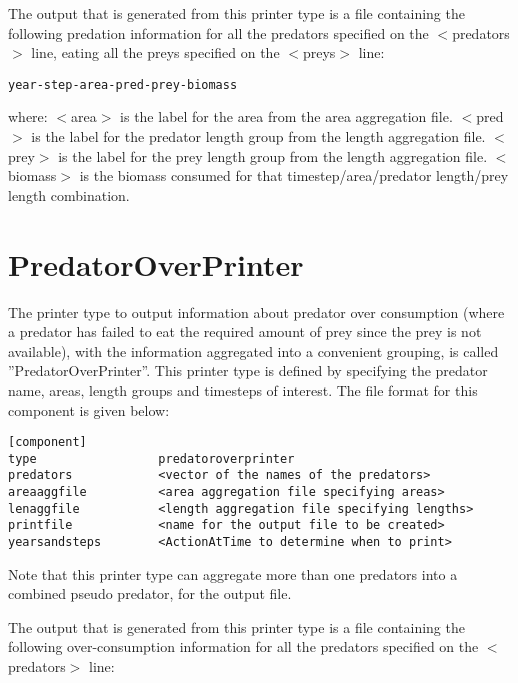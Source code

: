 \documentclass [a4paper, 10pt]{book}
\begin{document}
\bigskip
The output that is generated from this printer type is a file containing the following predation information for all the predators specified on the $<$predators$>$ line, eating all the preys specified on the $<$preys$>$ line:

{\small\begin{verbatim}
year-step-area-pred-prey-biomass
\end{verbatim}}

where:\newline
$<$area$>$ is the label for the area from the area aggregation file.\newline
$<$pred$>$ is the label for the predator length group from the length aggregation file.\newline
$<$prey$>$ is the label for the prey length group from the length aggregation file.\newline
$<$biomass$>$ is the biomass consumed for that timestep/area/predator length/prey length combination.

\section{PredatorOverPrinter}\label{sec:predatoroverprinter}
The printer type to output information about predator over consumption (where a predator has failed to eat the required amount of prey since the prey is not available), with the information aggregated into a convenient grouping, is called ''PredatorOverPrinter''.  This printer type is defined by specifying the predator name, areas, length groups and timesteps of interest.  The file format for this component is given below:

{\small\begin{verbatim}
[component]
type                 predatoroverprinter
predators            <vector of the names of the predators>
areaaggfile          <area aggregation file specifying areas>
lenaggfile           <length aggregation file specifying lengths>
printfile            <name for the output file to be created>
yearsandsteps        <ActionAtTime to determine when to print>
\end{verbatim}}

Note that this printer type can aggregate more than one predators into a combined pseudo predator, for the output file.

\bigskip
The output that is generated from this printer type is a file containing the following over-consumption information for all the predators specified on the $<$predators$>$ line:
\end{document}
